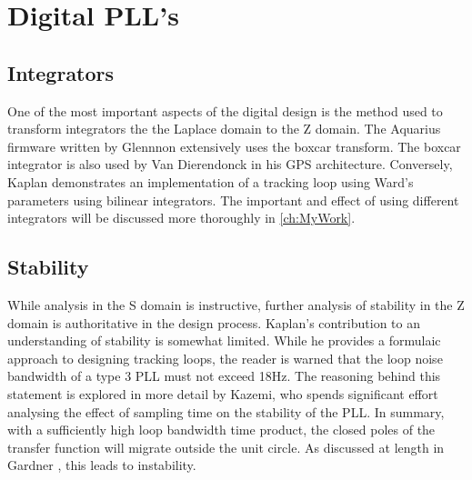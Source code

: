 \clearpage

\section{Digital PLL's}
	\subsection{Integrators}
	One of the most important aspects of the digital design is the method used to transform integrators the the Laplace domain to the Z domain. The Aquarius firmware\cite{FirmwareCode} written by Glennnon extensively uses the boxcar transform. The boxcar integrator is also used by Van Dierendonck  \cite{Spilker} in his GPS architecture. Conversely, Kaplan \cite{Kaplan} demonstrates an implementation of a tracking loop using Ward's parameters using bilinear integrators. The important and effect of using different integrators will be discussed more thoroughly in \ref{ch:MyWork}.
	
	\subsection{Stability}
	    While analysis in the S domain is instructive, further analysis of stability in the Z domain is authoritative in the design process. Kaplan's contribution to an understanding of stability is somewhat limited. While he provides a formulaic approach to designing tracking loops, the reader is warned that the loop noise bandwidth of a type 3 PLL must not exceed 18Hz\cite{Kaplan}. The reasoning behind this statement is explored in more detail by Kazemi, who spends significant effort analysing the effect of sampling time on the stability of the PLL. In summary, with a sufficiently high loop bandwidth time product, the closed poles of the transfer function will migrate outside the unit circle. As discussed at length in Gardner \cite{Gardner}, this leads to instability. 






	    